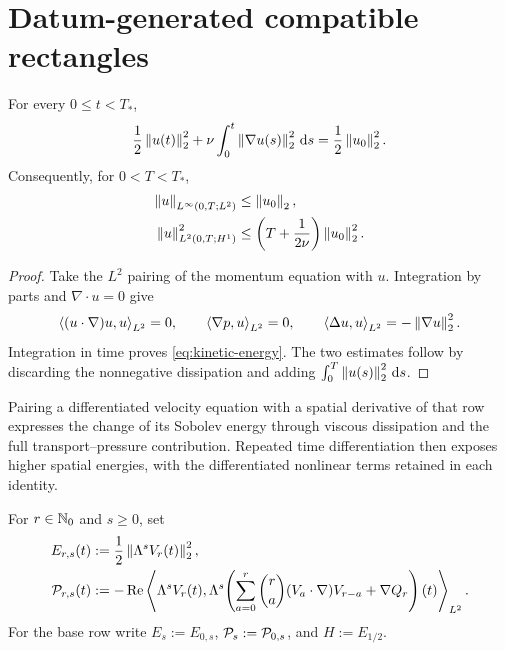 \section{Datum-generated compatible rectangles}

\begin{proposition}
\label{prop:kinetic-energy}
For every \(0\le t<T_*\),
\begin{equation}
 \frac12\left\lVert u(t)\right\rVert_2^2
 +\nu\int_0^t\left\lVert \nabla u(s)\right\rVert_2^2\,\mathrm d s
 =\frac12\left\lVert u_0\right\rVert_2^2.
 \label{eq:kinetic-energy}
\end{equation}
Consequently, for \(0<T<T_*\),
\begin{align}
 \left\lVert u\right\rVert_{L^\infty(0,T;L^2)}&\le\left\lVert u_0\right\rVert_2,
 \label{eq:energy-Linf}\\
 \left\lVert u\right\rVert_{L^2(0,T;H^1)}^2
 &\le\left(T+\frac1{2\nu}\right)\left\lVert u_0\right\rVert_2^2.
 \label{eq:energy-L2H1}
\end{align}
\end{proposition}

\begin{proof}
Take the \(L^2\) pairing of the momentum equation with \(u\).  Integration
by parts and \(\nabla\cdot u=0\) give
\[
 \left\langle (u\cdot\nabla)u,u\right\rangle_{L^2}=0,
 \qquad
 \left\langle \nabla p,u\right\rangle_{L^2}=0,
 \qquad
 \left\langle \Delta u,u\right\rangle_{L^2}=-\left\lVert \nabla u\right\rVert_2^2.
\]
Integration in time proves \eqref{eq:kinetic-energy}.  The two estimates
follow by discarding the nonnegative dissipation and adding
\(\int_0^T\left\lVert u(s)\right\rVert_2^2\,\mathrm d s\).
\end{proof}

Pairing a differentiated velocity equation with a spatial derivative of
that row expresses the change of its Sobolev energy through viscous
dissipation and the full transport--pressure contribution.  Repeated time
differentiation then exposes higher spatial energies, with the differentiated
nonlinear terms retained in each identity.

\begin{definition}
\label{def:critical-height-rows}
For \(r\in\mathbb N_0\) and \(s\ge0\), set
\begin{align}
 E_{r,s}(t)&:=\frac12\left\lVert \Lambda^sV_r(t)\right\rVert_2^2,
 \label{eq:temporal-row-spatial-energy}\\
 \mathcal P_{r,s}(t)&:=-\operatorname{Re}
 \left\langle \Lambda^sV_r(t),\Lambda^s\!\left(
   \sum_{a=0}^{r}\binom ra(V_a\cdot\nabla)V_{r-a}+\nabla Q_r
 \right)(t)\right\rangle_{L^2}.
 \label{eq:temporal-row-pressure-complete-transfer}
\end{align}
For the base row write \(E_s:=E_{0,s}\), \(\mathcal P_s:=\mathcal P_{0,s}\), and
\(H:=E_{1/2}\).
\end{definition}


